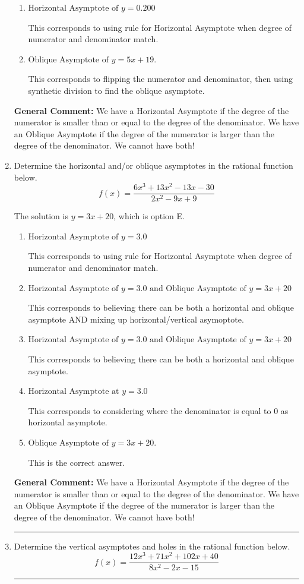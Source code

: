\documentclass{extbook}[14pt]
\newcommand{\litem}[1]{\item #1

\rule{\textwidth}{0.4pt}}
\begin{document}
\begin{enumerate}
{\begin{enumerate}[label=\Alph*.]
This corresponds to believing there can be both a horizontal and oblique asymptote.
\item \( \text{Horizontal Asymptote of } y = 0.200  \)

This corresponds to using rule for Horizontal Asymptote when degree of numerator and denominator match.
\item \( \text{Oblique Asymptote of } y = 5x + 19. \)

This corresponds to flipping the numerator and denominator, then using synthetic division to find the oblique asymptote.
\end{enumerate}

\textbf{General Comment:} We have a Horizontal Asymptote if the degree of the numerator is smaller than or equal to the degree of the denominator. We have an Oblique Asymptote if the degree of the numerator is larger than the degree of the denominator. We cannot have both!
}
\litem{
Determine the horizontal and/or oblique asymptotes in the rational function below.
\[ f(x) = \frac{6x^{3} +13 x^{2} -13 x -30}{2x^{2} -9 x + 9} \]

The solution is \( y = 3x + 20 \), which is option E.\begin{enumerate}[label=\Alph*.]
\item \( \text{Horizontal Asymptote of } y = 3.0  \)

This corresponds to using rule for Horizontal Asymptote when degree of numerator and denominator match.
\item \( \text{Horizontal Asymptote of } y = 3.0 \text{ and Oblique Asymptote of } y = 3x + 20 \)

This corresponds to believing there can be both a horizontal and oblique asymptote AND mixing up horizontal/vertical asymoptote.
\item \( \text{Horizontal Asymptote of } y = 3.0 \text{ and Oblique Asymptote of } y = 3x + 20 \)

This corresponds to believing there can be both a horizontal and oblique asymptote.
\item \( \text{Horizontal Asymptote at } y = 3.0 \)

This corresponds to considering where the denominator is equal to 0 as horizontal asymptote.
\item \( \text{Oblique Asymptote of } y = 3x + 20. \)

This is the correct answer.
\end{enumerate}

\textbf{General Comment:} We have a Horizontal Asymptote if the degree of the numerator is smaller than or equal to the degree of the denominator. We have an Oblique Asymptote if the degree of the numerator is larger than the degree of the denominator. We cannot have both!
}
\litem{
Determine the vertical asymptotes and holes in the rational function below.
\[ f(x) = \frac{12x^{3} +71 x^{2} +102 x + 40}{8x^{2} -2 x -15} \]

}
\end{enumerate}
\end{document}
